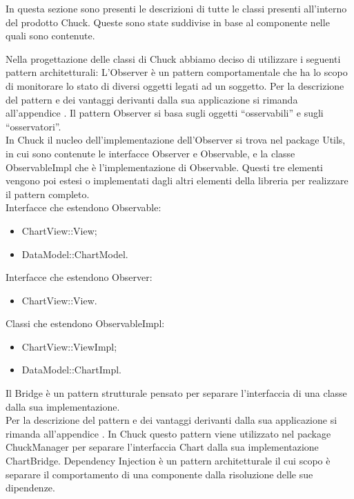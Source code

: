 		
		
		In questa sezione sono presenti le descrizioni di tutte le classi presenti all'interno del prodotto Chuck. Queste sono state suddivise in base al componente nelle quali sono contenute.
		
Nella progettazione delle classi di Chuck abbiamo deciso di utilizzare i seguenti pattern architetturali:
	L'Observer è un pattern comportamentale che ha lo scopo di monitorare lo stato di diversi oggetti legati ad un soggetto.
	Per la descrizione del pattern e dei vantaggi derivanti dalla sua applicazione si rimanda all'appendice .
	Il pattern Observer si basa sugli oggetti “osservabili” e sugli “osservatori”. \\In Chuck il nucleo dell'implementazione dell'Observer si trova nel package Utils, in cui sono contenute le interfacce Observer e Observable, e la classe ObservableImpl che è l'implementazione di Observable. Questi tre elementi vengono poi estesi o implementati dagli altri elementi della libreria per realizzare il pattern completo.\\
	Interfacce che estendono Observable:
	\begin{itemize}
	\item ChartView::View;
	\item DataModel::ChartModel.
	\end{itemize}
	Interfacce che estendono Observer:
	\begin{itemize}
	\item ChartView::View.
	\end{itemize}
	Classi che estendono ObservableImpl:
	\begin{itemize}
	\item ChartView::ViewImpl;
	\item DataModel::ChartImpl.
	\end{itemize}
	Il Bridge è un pattern strutturale pensato per separare l'interfaccia di una classe dalla sua implementazione.\\ Per la descrizione del pattern e dei vantaggi derivanti dalla sua applicazione si rimanda all'appendice .
	In Chuck questo pattern viene utilizzato nel package ChuckManager per separare l'interfaccia Chart dalla sua implementazione ChartBridge.
	Dependency Injection è un pattern architetturale il cui scopo è separare il comportamento di una componente dalla risoluzione delle sue dipendenze.\\
